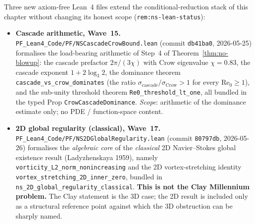 \begin{remark}\label{rem:ns-wave16-18-lean}
Three new axiom-free Lean~4 files extend the conditional-reduction stack of this chapter without changing its honest scope (\texttt{rem:ns-lean-status}):
\begin{itemize}
  \item \textbf{Cascade arithmetic, Wave~15.} \texttt{PF\_Lean4\_Code/PF/NSCascadeCrowBound.lean} (commit \texttt{db41ba0}, 2026-05-25) formalises the load-bearing arithmetic of Step~4 of Theorem~\ref{thm:no-blowup}: the cascade prefactor $2\pi/(3\chi)$ with Crow eigenvalue $\chi = 0.83$, the cascade exponent $1 + 2\log_3 2$, the dominance theorem \texttt{cascade\_vs\_crow\_dominates} (the ratio $\sigma_{\mathrm{cascade}}/\sigma_{\mathrm{Crow}} > 1$ for every $\mathrm{Re}_0 \geq 1$), and the sub-unity threshold theorem \texttt{Re0\_threshold\_lt\_one}, all bundled in the typed Prop \texttt{CrowCascadeDominance}. \emph{Scope}: arithmetic of the dominance estimate only; no PDE / function-space content.
  \item \textbf{2D global regularity (classical), Wave~17.} \texttt{PF\_Lean4\_Code/PF/NS2DGlobalRegularity.lean} (commit \texttt{80797db}, 2026-05-26) formalises the \emph{algebraic core} of the \emph{classical} 2D Navier--Stokes global existence result (Ladyzhenskaya 1959), namely \texttt{vorticity\_L2\_norm\_nonincreasing} and the 2D vortex-stretching identity \texttt{vortex\_stretching\_2D\_inner\_zero}, bundled in \texttt{ns\_2D\_global\_regularity\_classical}. \textbf{This is not the Clay Millennium problem.} The Clay statement is the 3D case; the 2D result is included only as a structural reference point against which the 3D obstruction can be sharply named.

\end{itemize}
\end{remark}

